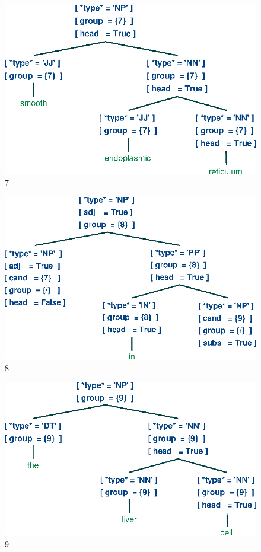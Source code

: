 \documentclass[a4paper]{article}
\begin{document}
\begin{figure}[h]
    \begin{center}
        \includegraphics[scale=0.5]{7.eps}
    \end{center}
    \caption{7}
\end{figure}
\begin{figure}[h]
    \begin{center}
        \includegraphics[scale=0.5]{8.eps}
    \end{center}
    \caption{8}
\end{figure}
\begin{figure}[h]
    \begin{center}
        \includegraphics[scale=0.5]{9.eps}
    \end{center}
    \caption{9}
\end{figure}
\end{document}
